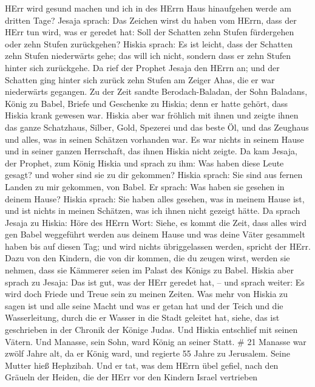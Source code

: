 HErr wird gesund machen und ich in des HErrn Haus hinaufgehen werde am
dritten Tage?  Jesaja sprach: Das Zeichen wirst du haben vom
HErrn, dass der HErr tun wird, was er geredet hat: Soll der Schatten
zehn Stufen fürdergehen oder zehn Stufen zurückgehen? 
Hiskia sprach: Es ist leicht, dass der Schatten zehn Stufen niederwärts
gehe; das will ich nicht, sondern dass er zehn Stufen hinter sich
zurückgehe.  Da rief der Prophet Jesaja den HErrn an; und
der Schatten ging hinter sich zurück zehn Stufen am Zeiger Ahas, die er
war niederwärts gegangen.  Zu der Zeit sandte
Berodach-Baladan, der Sohn Baladans, König zu Babel, Briefe und
Geschenke zu Hiskia; denn er hatte gehört, dass Hiskia krank gewesen
war.  Hiskia aber war fröhlich mit ihnen und zeigte ihnen
das ganze Schatzhaus, Silber, Gold, Spezerei und das beste Öl, und das
Zeughaus und alles, was in seinen Schätzen vorhanden war. Es war nichts
in seinem Hause und in seiner ganzen Herrschaft, das ihnen Hiskia nicht
zeigte.  Da kam Jesaja, der Prophet, zum König Hiskia und
sprach zu ihm: Was haben diese Leute gesagt? und woher sind sie zu dir
gekommen? Hiskia sprach: Sie sind aus fernen Landen zu mir gekommen, von
Babel.  Er sprach: Was haben sie gesehen in deinem Hause?
Hiskia sprach: Sie haben alles gesehen, was in meinem Hause ist, und ist
nichts in meinen Schätzen, was ich ihnen nicht gezeigt hätte.
 Da sprach Jesaja zu Hiskia: Höre des HErrn Wort:
 Siehe, es kommt die Zeit, dass alles wird gen Babel
weggeführt werden aus deinem Hause und was deine Väter gesammelt haben
bis auf diesen Tag; und wird nichts übriggelassen werden, spricht der
HErr.  Dazu von den Kindern, die von dir kommen, die du
zeugen wirst, werden sie nehmen, dass sie Kämmerer seien im Palast des
Königs zu Babel.  Hiskia aber sprach zu Jesaja: Das ist
gut, was der HErr geredet hat, -- und sprach weiter: Es wird doch Friede
und Treue sein zu meinen Zeiten.  Was mehr von Hiskia zu
sagen ist und alle seine Macht und was er getan hat und der Teich und
die Wasserleitung, durch die er Wasser in die Stadt geleitet hat, siehe,
das ist geschrieben in der Chronik der Könige Judas.  Und
Hiskia entschlief mit seinen Vätern. Und Manasse, sein Sohn, ward König
an seiner Statt. \# 21  Manasse war zwölf Jahre alt, da er
König ward, und regierte 55 Jahre zu Jerusalem. Seine Mutter hieß
Hephzibah.  Und er tat, was dem HErrn übel gefiel, nach den
Gräueln der Heiden, die der HErr vor den Kindern Israel vertrieben
